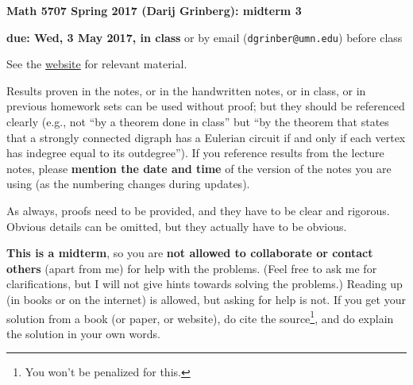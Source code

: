 \documentclass[numbers=enddot,12pt,final,onecolumn,notitlepage]{scrartcl}%
\theoremstyle{definition}
\begin{document}
\begin{center}
\textbf{Math 5707 Spring 2017 (Darij Grinberg): midterm 3}

\textbf{due: Wed, 3 May 2017, in class} or by email
(\texttt{dgrinber@umn.edu}) before class
\end{center}

See the \href{http://www-users.math.umn.edu/~dgrinber/5707s17}{website} for relevant material.

{\small Results proven in the notes, or in the handwritten notes, or in class, or in previous homework sets can be used without proof; but they should be referenced clearly (e.g., not ``by a theorem done in class'' but ``by the theorem that states that a strongly connected digraph has a Eulerian circuit if and only if each vertex has indegree equal to its outdegree'').
If you reference results from the lecture notes, please \textbf{mention the date and time} of the version of the notes you are using (as the numbering changes during updates).

As always, proofs need to be provided, and they have to be clear and rigorous. Obvious details can be omitted, but they actually have to be obvious.



\textbf{This is a midterm}, so you are \textbf{not allowed to collaborate or contact others} (apart from me) for help with the problems. (Feel free to ask me for clarifications, but I will not give hints towards solving the problems.) Reading up (in books or on the internet) is allowed, but asking for help is not. If you get your solution from a book (or paper, or website), do cite the source\footnote{You won't be penalized for this.}, and do explain the solution in your own words. }
\end{document}
